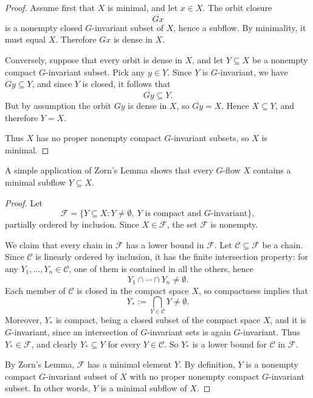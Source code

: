 \begin{proof}
    Assume first that $X$ is minimal, and let $x \in X$. The orbit closure
    \[
        \overline{Gx}
    \]
    is a nonempty closed $G$-invariant subset of $X$, hence a subflow. By minimality, it must equal $X$. Therefore $Gx$ is dense in $X$.

    Conversely, suppose that every orbit is dense in $X$, and let $Y \subseteq X$ be a nonempty compact $G$-invariant subset. Pick any $y \in Y$. Since $Y$ is $G$-invariant, we have $Gy \subseteq Y$, and since $Y$ is closed, it follows that
    \[
        \overline{Gy} \subseteq Y.
    \]
    But by assumption the orbit $Gy$ is dense in $X$, so $\overline{Gy}=X$. Hence $X \subseteq Y$, and therefore $Y=X$.

    Thus $X$ has no proper nonempty compact $G$-invariant subsets, so $X$ is minimal.
\end{proof}

A simple application of Zorn's Lemma shows that every $G$-flow $X$ contains a minimal subflow $Y\subseteq X$.

\begin{proof}
    Let
    \[
        \mathcal{F}=\{Y\subseteq X : Y \neq \emptyset,\ Y \text{ is compact and } G\text{-invariant}\},
    \]
    partially ordered by inclusion. Since $X \in \mathcal{F}$, the set $\mathcal{F}$ is nonempty.

    We claim that every chain in $\mathcal{F}$ has a lower bound in $\mathcal{F}$. Let $\mathcal{C}\subseteq \mathcal{F}$ be a chain. Since $\mathcal{C}$ is linearly ordered by inclusion, it has the finite intersection property: for any $Y_1,\dots,Y_n\in\mathcal{C}$, one of them is contained in all the others, hence
    \[
        Y_1\cap\cdots\cap Y_n \neq \emptyset.
    \]
    Each member of $\mathcal{C}$ is closed in the compact space $X$, so compactness implies that
    \[
        Y_*:=\bigcap_{Y\in\mathcal{C}} Y \neq \emptyset.
    \]
    Moreover, $Y_*$ is compact, being a closed subset of the compact space $X$, and it is $G$-invariant, since an intersection of $G$-invariant sets is again $G$-invariant. Thus $Y_* \in \mathcal{F}$, and clearly $Y_* \subseteq Y$ for every $Y\in\mathcal{C}$. So $Y_*$ is a lower bound for $\mathcal{C}$ in $\mathcal{F}$.

    By Zorn's Lemma, $\mathcal{F}$ has a minimal element $Y$. By definition, $Y$ is a nonempty compact $G$-invariant subset of $X$ with no proper nonempty compact $G$-invariant subset. In other words, $Y$ is a minimal subflow of $X$.
\end{proof}


